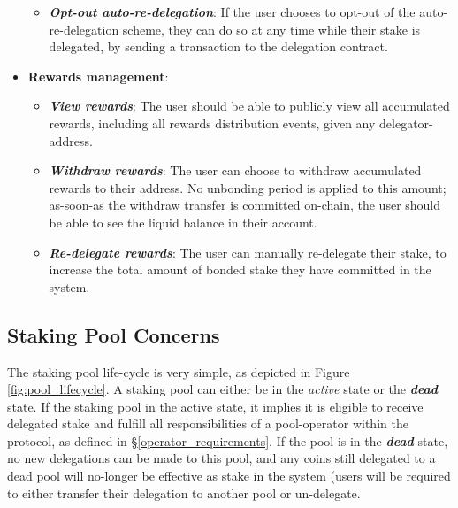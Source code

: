 \begin{itemize}
\begin{itemize}
        \item \textit{\textbf{Opt-out auto-re-delegation}}: If the user chooses to opt-out of the auto-re-delegation scheme, they can do so at any time while their stake is delegated, by sending a transaction to the delegation contract.  
    \end{itemize}
    \item \textbf{Rewards management}: 
    \begin{itemize}
        \item \textit{\textbf{View rewards}}: The user should be able to publicly view all accumulated rewards, including all rewards distribution events, given any delegator-address.  
        \item \textit{\textbf{Withdraw rewards}}: The user can choose to withdraw accumulated rewards to their address. No unbonding period is applied to this amount; as-soon-as the withdraw transfer is committed on-chain, the user should be able to see the liquid balance in their account. 
        \item \textit{\textbf{Re-delegate rewards}}: The user can manually re-delegate their stake, to increase the total amount of bonded stake they have committed in the system.   
    \end{itemize}
\end{itemize}

\subsection{Staking Pool Concerns} \label{pool_concerns}

The staking pool life-cycle is very simple, as depicted in Figure \ref{fig:pool_lifecycle}. A staking pool can either be in the \textit{active} state or the \textbf{\textit{dead}} state. If the staking pool in the active state, it implies it is eligible to receive delegated stake and fulfill all responsibilities of a pool-operator within the protocol, as defined in \S\ref{operator_requirements}. If the pool is in the \textbf{\textit{dead}} state, no new delegations can be made to this pool, and any coins still delegated to a dead pool will no-longer be effective as stake in the system (users will be required to either transfer their delegation to another pool or un-delegate. 

